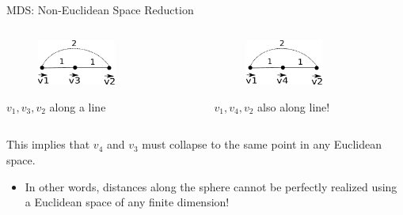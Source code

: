 \documentclass{beamer}
\begin{document}
\begin{frame}{MDS: Non-Euclidean Space Reduction}

\begin{columns}
\begin{column}[T]{4cm}
\begin{figure}[t]
    \includegraphics[width=0.6\textwidth]{PointsLineSphere1.pdf}
\end{figure}
$v_1,v_3,v_2$ along a line
\end{column}

\begin{column}[T]{4cm}
\begin{center}
\begin{figure}[t]
    \includegraphics[width=0.6\textwidth]{PointsLineSphere2.pdf}
\end{figure}
$v_1,v_4,v_2$ also along line!
\end{center}
\end{column}
\end{columns}

This implies that $v_4$ and $v_3$ must collapse to the same point in any Euclidean space.

\begin{itemize}[label=$\vartriangleright$]
\item In other words, distances along the sphere cannot be perfectly realized using a Euclidean space of any finite dimension!
\end{itemize}

\end{frame}
\end{document}
